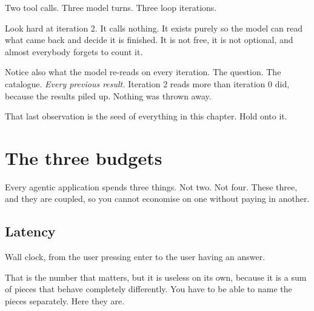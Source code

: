 Two tool calls. Three model turns. Three loop iterations.

Look hard at iteration 2. It calls nothing. It exists purely so the model can
read what came back and decide it is finished. It is not free, it is not
optional, and almost everybody forgets to count it.


Notice also what the model re-reads on every iteration. The question. The
catalogue. \emph{Every previous result.} Iteration 2 reads more than iteration 0
did, because the results piled up. Nothing was thrown away.

That last observation is the seed of everything in this chapter. Hold onto it.

\section{The three budgets}
\label{sec:three-budgets}

Every agentic application spends three things. Not two. Not four. These three,
and they are coupled, so you cannot economise on one without paying in another.


\subsection{Latency}

Wall clock, from the user pressing enter to the user having an answer.

That is the number that matters, but it is useless on its own, because it is a
sum of pieces that behave completely differently. You have to be able to name
the pieces separately. Here they are.


